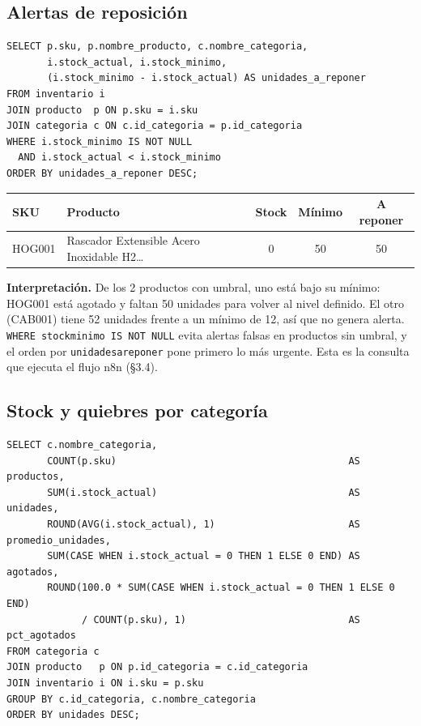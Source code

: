 \documentclass[11pt,letterpaper]{article}
\renewcommand{\_}{\oldus\allowbreak}
\begin{document}
\subsection{Alertas de reposición}
\begin{lstlisting}[caption={Consulta 2: alertas de reposición.}]
SELECT p.sku, p.nombre_producto, c.nombre_categoria,
       i.stock_actual, i.stock_minimo,
       (i.stock_minimo - i.stock_actual) AS unidades_a_reponer
FROM inventario i
JOIN producto  p ON p.sku = i.sku
JOIN categoria c ON c.id_categoria = p.id_categoria
WHERE i.stock_minimo IS NOT NULL
  AND i.stock_actual < i.stock_minimo
ORDER BY unidades_a_reponer DESC;
\end{lstlisting}

\begin{center}
\small
\begin{minipage}{\textwidth}\centering
{}
\begin{tabular}{llccc}
\toprule
\textbf{SKU} & \textbf{Producto} & \textbf{Stock} & \textbf{Mínimo} & \textbf{A reponer} \\
\midrule
HOG001 & Rascador Extensible Acero Inoxidable H2\ldots & 0 & 50 & 50 \\
\bottomrule
\end{tabular}
\end{minipage}
\end{center}

\textbf{Interpretación.} De los 2 productos con umbral, uno está bajo su mínimo: HOG001 está agotado y faltan 50 unidades para volver al nivel definido. El otro (CAB001) tiene 52 unidades frente a un mínimo de 12, así que no genera alerta. \texttt{WHERE stock\_minimo IS NOT NULL} evita alertas falsas en productos sin umbral, y el orden por \texttt{unidades\_a\_reponer} pone primero lo más urgente. Esta es la consulta que ejecuta el flujo n8n (§3.4).

\subsection{Stock y quiebres por categoría}
\begin{lstlisting}[caption={Consulta 3: stock y quiebres por categoría.}]
SELECT c.nombre_categoria,
       COUNT(p.sku)                                        AS productos,
       SUM(i.stock_actual)                                 AS unidades,
       ROUND(AVG(i.stock_actual), 1)                       AS promedio_unidades,
       SUM(CASE WHEN i.stock_actual = 0 THEN 1 ELSE 0 END) AS agotados,
       ROUND(100.0 * SUM(CASE WHEN i.stock_actual = 0 THEN 1 ELSE 0 END)
             / COUNT(p.sku), 1)                            AS pct_agotados
FROM categoria c
JOIN producto   p ON p.id_categoria = c.id_categoria
JOIN inventario i ON i.sku = p.sku
GROUP BY c.id_categoria, c.nombre_categoria
ORDER BY unidades DESC;
\end{lstlisting}
\end{document}
